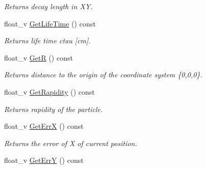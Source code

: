 \begin{DoxyCompactItemize}
\begin{DoxyCompactList}\small\item\em Returns decay length in XY. \end{DoxyCompactList}\item 
float\+\_\+v \hyperlink{classKFParticleSIMD_a375dc8b80e460a60f83baecfbf218aec}{Get\+Life\+Time} () const \hypertarget{classKFParticleSIMD_a375dc8b80e460a60f83baecfbf218aec}{}\label{classKFParticleSIMD_a375dc8b80e460a60f83baecfbf218aec}

\begin{DoxyCompactList}\small\item\em Returns life time ctau \mbox{[}cm\mbox{]}. \end{DoxyCompactList}\item 
float\+\_\+v \hyperlink{classKFParticleSIMD_a7dd8172c4eaf193df4d7897437909234}{GetR} () const \hypertarget{classKFParticleSIMD_a7dd8172c4eaf193df4d7897437909234}{}\label{classKFParticleSIMD_a7dd8172c4eaf193df4d7897437909234}

\begin{DoxyCompactList}\small\item\em Returns distance to the origin of the coordinate system \{0,0,0\}. \end{DoxyCompactList}\item 
float\+\_\+v \hyperlink{classKFParticleSIMD_a2070ffe1acfd297cdbc04e5c8487f5e4}{Get\+Rapidity} () const \hypertarget{classKFParticleSIMD_a2070ffe1acfd297cdbc04e5c8487f5e4}{}\label{classKFParticleSIMD_a2070ffe1acfd297cdbc04e5c8487f5e4}

\begin{DoxyCompactList}\small\item\em Returns rapidity of the particle. \end{DoxyCompactList}\item 
float\+\_\+v \hyperlink{classKFParticleSIMD_a9850f443d65efe8bf2d785423e208472}{Get\+ErrX} () const \hypertarget{classKFParticleSIMD_a9850f443d65efe8bf2d785423e208472}{}\label{classKFParticleSIMD_a9850f443d65efe8bf2d785423e208472}

\begin{DoxyCompactList}\small\item\em Returns the error of X of current position. \end{DoxyCompactList}\item 
float\+\_\+v \hyperlink{classKFParticleSIMD_a77a8d9d475e08abc797281d28d1e42e7}{Get\+ErrY} () const \hypertarget{classKFParticleSIMD_a77a8d9d475e08abc797281d28d1e42e7}{}\label{classKFParticleSIMD_a77a8d9d475e08abc797281d28d1e42e7}


\end{DoxyCompactItemize}
